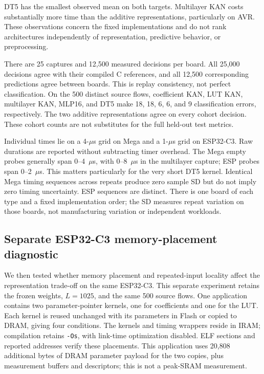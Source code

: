 \documentclass{ieeeaccess}
\begin{document}
DT5 has the smallest observed mean on both targets. Multilayer KAN costs substantially more time than the additive representations, particularly on AVR. These observations concern the fixed implementations and do not rank architectures independently of representation, predictive behavior, or preprocessing.

There are 25 captures and 12,500 measured decisions per board. All 25,000 decisions agree with their compiled C references, and all 12,500 corresponding predictions agree between boards. This is replay consistency, not perfect classification. On the 500 distinct source flows, coefficient KAN, LUT KAN, multilayer KAN, MLP16, and DT5 make 18, 18, 6, 6, and 9 classification errors, respectively. The two additive representations agree on every cohort decision. These cohort counts are not substitutes for the full held-out test metrics.

Individual times lie on a 4-$\mu$s grid on Mega and a 1-$\mu$s grid on ESP32-C3. Raw durations are reported without subtracting timer overhead. The Mega empty probes generally span 0--4~$\mu$s, with 0--8~$\mu$s in the multilayer capture; ESP probes span 0--2~$\mu$s. This matters particularly for the very short DT5 kernel. Identical Mega timing sequences across repeats produce zero sample SD but do not imply zero timing uncertainty. ESP sequences are distinct. There is one board of each type and a fixed implementation order; the SD measures repeat variation on those boards, not manufacturing variation or independent workloads.

\subsection{Separate ESP32-C3 memory-placement diagnostic}
\label{sec:c3diagnostic}
We then tested whether memory placement and repeated-input locality affect the representation trade-off on the same ESP32-C3. This separate experiment retains the frozen weights, $L=1025$, and the same 500 source flows. One application contains two parameter-pointer kernels, one for coefficients and one for the LUT. Each kernel is reused unchanged with its parameters in Flash or copied to DRAM, giving four conditions. The kernels and timing wrappers reside in IRAM; compilation retains \texttt{-Os}, with link-time optimization disabled. ELF sections and reported addresses verify these placements. This application uses 20,808 additional bytes of DRAM parameter payload for the two copies, plus measurement buffers and descriptors; this is not a peak-SRAM measurement.
\end{document}

